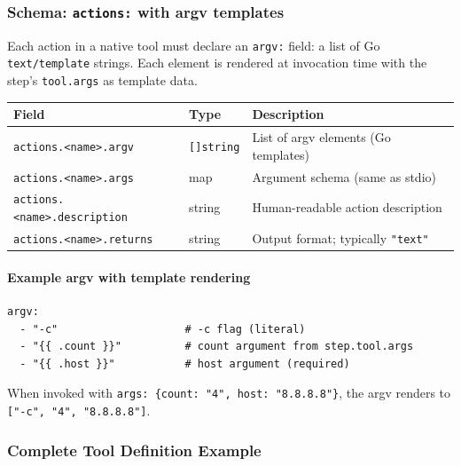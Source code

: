 \subsubsection{Schema: \texttt{actions:} with argv templates}

Each action in a native tool must declare an \texttt{argv:} field: a list of
Go \texttt{text/template} strings.  Each element is rendered at invocation time
with the step's \texttt{tool.args} as template data.

\begin{center}
\begin{tabular}{llp{8cm}}
\hline
\textbf{Field} & \textbf{Type} & \textbf{Description} \\
\hline
\texttt{actions.<name>.argv}        & \texttt{[]string} & List of argv elements (Go templates) \\
\texttt{actions.<name>.args}        & map              & Argument schema (same as stdio) \\
\texttt{actions.<name>.description} & string           & Human-readable action description \\
\texttt{actions.<name>.returns}     & string           & Output format; typically \texttt{"text"} \\
\hline
\end{tabular}
\end{center}

\paragraph{Example argv with template rendering}

\begin{center}
\begin{verbatim}
argv:
  - "-c"                    # -c flag (literal)
  - "{{ .count }}"          # count argument from step.tool.args
  - "{{ .host }}"           # host argument (required)
\end{verbatim}
\end{center}

When invoked with \texttt{args: \{count: "4", host: "8.8.8.8"\}}, the argv
renders to \texttt{["-c", "4", "8.8.8.8"]}.

\subsubsection{Complete Tool Definition Example}


